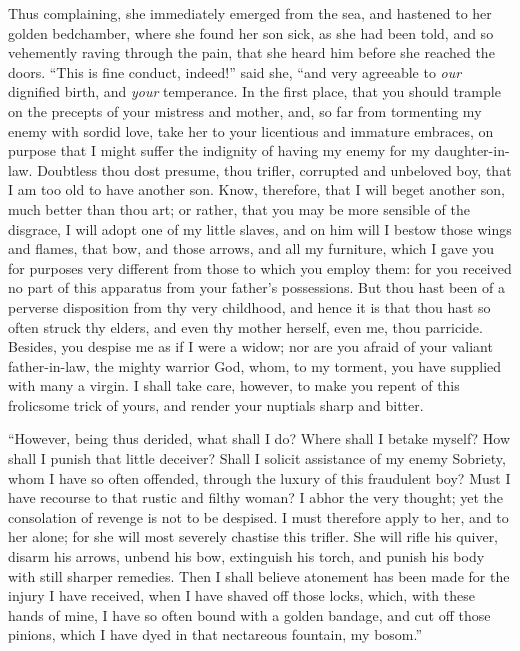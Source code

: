 \documentclass[12pt]{article}
\begin{document}
Thus complaining, she immediately emerged from the sea, and hastened to her
golden bedchamber, where she found her son sick, as she had been told, and so
vehemently raving through the pain, that she heard him before she reached the
doors. ``This is fine conduct, indeed!'' said she, ``and very agreeable to
\textit{our} dignified birth, and \textit{your} temperance. In the first place,
that you should trample on the precepts of your mistress and mother, and, so
far from tormenting my enemy with sordid love, take her to your licentious and
immature embraces, on purpose that I might suffer the indignity of having my
enemy for my daughter-in-law. Doubtless thou dost presume, thou trifler,
corrupted and unbeloved boy, that I am too old to have another son. Know,
therefore, that I will beget another son, much better than thou art; or rather,
that you may be more sensible of the disgrace, I will adopt one of my little
slaves, and on him will I bestow those wings and flames, that bow, and those
arrows, and all my furniture, which I gave you for purposes very different from
those to which you employ them: for you received no part of this apparatus from
your father's possessions. But thou hast been of a perverse disposition from
thy very childhood, and hence it is that thou hast so often struck thy elders,
and even thy mother herself, even me, thou parricide. Besides, you despise me
as if I were a widow; nor are you afraid of your valiant father-in-law, the
mighty warrior God, whom, to my torment, you have supplied with many a virgin.
I shall take care, however, to make you repent of this frolicsome trick of
yours, and render your nuptials sharp and bitter.

``However, being thus derided, what shall I do? Where shall I betake myself?
How shall I punish that little deceiver? Shall I solicit assistance of my enemy
Sobriety, whom I have so often offended, through the luxury of this fraudulent
boy? Must I have recourse to that rustic and filthy woman? I abhor the very
thought; yet the consolation of revenge is not to be despised. I must therefore
apply to her, and to her alone; for she will most severely chastise this
trifler. She will rifle his quiver, disarm his arrows, unbend his bow,
extinguish his torch, and punish his body with still sharper remedies. Then I
shall believe atonement has been made for the injury I have received, when I
have shaved off those locks, which, with these hands of mine, I have so often
bound with a golden bandage, and cut off those pinions, which I have dyed in
that nectareous fountain, my bosom.''
\end{document}
